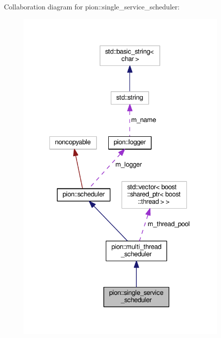 Collaboration diagram for pion\-:\-:single\-\_\-service\-\_\-scheduler\-:
\nopagebreak
\begin{figure}[H]
\begin{center}
\leavevmode
\includegraphics[width=293pt]{classpion_1_1single__service__scheduler__coll__graph}
\end{center}
\end{figure}
